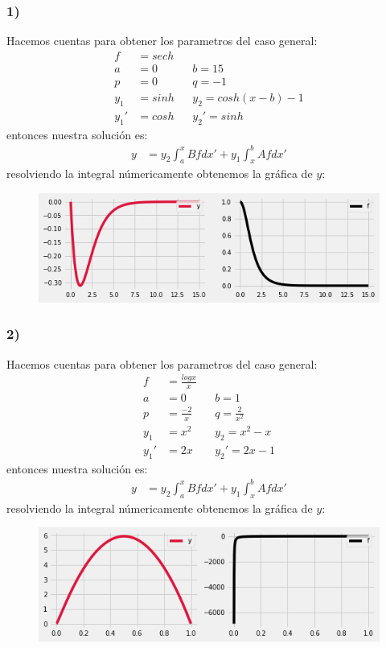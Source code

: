 \documentclass{article}
\begin{document}
\begin{tcolorbox}[breakable]
    \subsubsection*{1)}
    Hacemos cuentas para obtener los parametros del caso general:
    \begin{align*}
        f&= sech \\
        a&=0 &&b=15 \\
        p&=0 &&q=-1 \\
        y_1 &= sinh  &&y_2= cosh(x-b)-1 \\
        y_1' &= cosh &&y_2'=sinh 
    \end{align*}
    entonces nuestra solución es:
    \begin{align*}
        y &=  y_2\int_{a}^x Bf dx' + y_1\int_{x}^b Afdx' 
    \end{align*}
    resolviendo la integral númericamente obtenemos la gráfica de $y$:
    \begin{figure}[H]
        \centering
        \includegraphics[scale=0.7]{images/p3_1.png}
    \end{figure}

    \subsubsection*{2)}
    Hacemos cuentas para obtener los parametros del caso general:
    \begin{align*}
        f&= \frac{logx}{x} \\
        a&=0 &&b=1 \\
        p&=\frac{-2}{x} &&q= \frac{2}{x^2} \\
        y_1 &= x^2  &&y_2= x^2-x \\
        y_1' &= 2x &&y_2'= 2x-1 
    \end{align*}
    entonces nuestra solución es:
    \begin{align*}
        y &=  y_2\int_{a}^x Bf dx' + y_1\int_{x}^b Afdx' 
    \end{align*}
    resolviendo la integral númericamente obtenemos la gráfica de $y$:
    \begin{figure}[H]
        \centering
        \includegraphics[scale=0.7]{images/p3_2.png}
    \end{figure}


\end{tcolorbox}
\end{document}
